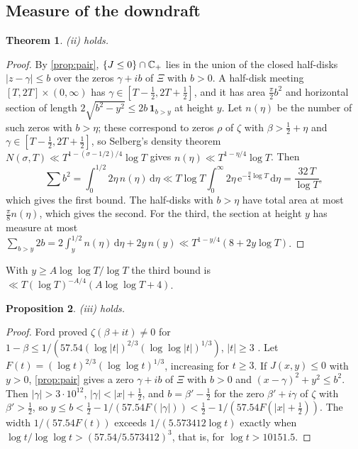 \documentclass[11pt]{article}
\newtheorem{theorem}{Theorem}[section]
\newtheorem{proposition}[theorem]{Proposition}
\theoremstyle{definition}\newtheorem{definition}[theorem]{Definition}
\theoremstyle{remark}\newtheorem{remark}[theorem]{Remark}
\newcommand{\dd}{\,\mathrm d}\newcommand{\e}{\mathrm e}
\begin{document}
\subsection{Measure of the downdraft}

\begin{theorem}\label{thm:measure}
(ii) holds.
\end{theorem}
\begin{proof}
By \cref{prop:pair}, $\{J\le0\}\cap\mathbb C_+$ lies in the union of the closed half-disks $|z-\gamma|\le b$ over the zeros $\gamma+ib$ of $\Xi$ with $b>0$. A half-disk meeting $[T,2T]\times(0,\infty)$ has $\gamma\in[T-\frac12,2T+\frac12]$, and it has area $\frac\pi2b^2$ and horizontal section of length $2\sqrt{b^2-y^2}\le2b\,\mathbf 1_{b>y}$ at height $y$. Let $n(\eta)$ be the number of such zeros with $b>\eta$; these correspond to zeros $\rho$ of $\zeta$ with $\beta>\frac12+\eta$ and $\gamma\in[T-\frac12,2T+\frac12]$, so Selberg's density theorem $N(\sigma,T)\ll T^{1-(\sigma-1/2)/4}\log T$ \cite{Selberg46} gives $n(\eta)\ll T^{1-\eta/4}\log T$. Then
\[
\sum b^2=\int_0^{1/2}2\eta\,n(\eta)\dd\eta\ll T\log T\int_0^\infty2\eta\,\e^{-\frac\eta4\log T}\dd\eta=\frac{32\,T}{\log T},
\]
which gives the first bound. The half-disks with $b>\eta$ have total area at most $\frac\pi8n(\eta)$, which gives the second. For the third, the section at height $y$ has measure at most $\sum_{b>y}2b=2\int_y^{1/2}n(\eta)\dd\eta+2y\,n(y)\ll T^{1-y/4}(8+2y\log T)$.
\end{proof}

With $y\ge A\log\log T/\log T$ the third bound is $\ll T(\log T)^{-A/4}(A\log\log T+4)$.

\begin{proposition}\label{prop:ford}
(iii) holds.
\end{proposition}
\begin{proof}
Ford proved $\zeta(\beta+it)\ne0$ for $1-\beta\le1/(57.54(\log|t|)^{2/3}(\log\log|t|)^{1/3})$, $|t|\ge3$ \cite[Thm.~5]{Ford}. Let $F(t)=(\log t)^{2/3}(\log\log t)^{1/3}$, increasing for $t\ge3$. If $J(x,y)\le0$ with $y>0$, \cref{prop:pair} gives a zero $\gamma+ib$ of $\Xi$ with $b>0$ and $(x-\gamma)^2+y^2\le b^2$. Then $|\gamma|>3\cdot10^{12}$, $|\gamma|<|x|+\frac12$, and $b=\beta'-\frac12$ for the zero $\beta'+i\gamma$ of $\zeta$ with $\beta'>\frac12$, so $y\le b<\frac12-1/(57.54F(|\gamma|))<\frac12-1/(57.54F(|x|+\frac12))$. The width $1/(57.54F(t))$ exceeds $1/(5.573412\log t)$ exactly when $\log t/\log\log t>(57.54/5.573412)^3$, that is, for $\log t>10151.5$.
\end{proof}
\end{document}
